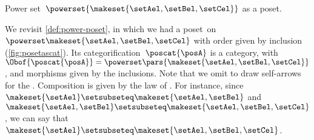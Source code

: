 \begin{marginfigure}
    \centering
    \caption{Power set~$\powerset{\makeset{\setAel,\setBel,\setCel}}$ as a poset.
        \label{fig:posetascat}}
\end{marginfigure}

\begin{example}
    We revisit \cref{def:power-poset}, in which we had a poset~\posA on $\powerset \makeset{\setAel,\setBel,\setCel}$ with order given by inclusion (\cref{fig:posetascat}).
    Its categorification~$\poscat{\posA}$ is a category, with $\Obof{\poscat{\posA}}=\powerset\pars{\makeset{\setAel,\setBel,\setCel}}$, and morphisms given by the inclusions.
    Note that we omit to draw self-arrows for the .
    Composition is given by the  law of .
    For instance, since~$\makeset{\setAel}\setsubseteq \makeset{\setAel,\setBel}$ and~$\makeset{\setAel,\setBel} \setsubseteq \makeset{\setAel,\setBel,\setCel}$, we can say that~$\makeset{\setAel}\setsubseteq \makeset{\setAel,\setBel,\setCel}$.
\end{example}